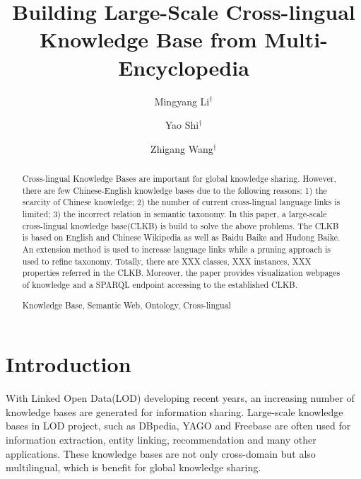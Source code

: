\documentclass[runningheads,a4paper]{llncs}
\newcommand{\keywords}[1]{\par\addvspace\baselineskip\noindent\keywordname\enspace\ignorespaces#1}
\begin{document}
\mainmatter

\title{Building Large-Scale Cross-lingual Knowledge Base from Multi-Encyclopedia}
\author{Mingyang Li$^\dag$ \and Yao Shi$^\dag$ \and Zhigang Wang$^\dag$}


\maketitle

\begin{abstract}

Cross-lingual Knowledge Bases are important for global knowledge sharing. However, there are few Chinese-English knowledge bases due to the following reasons: 1) the scarcity of Chinese knowledge; 2) the number of current cross-lingual language links is limited; 3) the incorrect relation in semantic taxonomy. In this paper, a large-scale cross-lingual knowledge base(CLKB) is build to solve the above problems. The CLKB is based on English and Chinese Wikipedia as well as Baidu Baike and Hudong Baike. An extension method is used to increase language links while a pruning approach is used to refine taxonomy. Totally, there are XXX classes, XXX instances, XXX properties referred in the CLKB. Moreover, the paper provides visualization webpages of knowledge and a SPARQL endpoint accessing to the established CLKB.

\keywords{Knowledge Base, Semantic Web, Ontology, Cross-lingual}
\end{abstract}

\section{Introduction}
With Linked Open Data(LOD) developing recent years, an increasing number of knowledge bases are generated for information sharing. Large-scale knowledge bases in LOD project, such as DBpedia\cite{mendes2012dbpedia}, YAGO\cite{mahdisoltani2014yago3} and Freebase\cite{bollacker2008freebase} are often used for information extraction\cite{dutta2013integrating}, entity linking\cite{shen2012linden}, recommendation\cite{passant2010dbrec,fernandez2011generic,kaminskas2012knowledge} and many other applications. These knowledge bases are not only cross-domain but also multilingual, which is benefit for global knowledge sharing.
\end{document}
